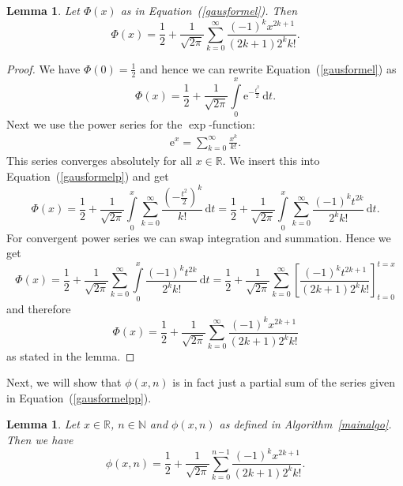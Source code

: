 \documentclass{article}
\newtheorem{lemma}[algorithm]{Lemma}
\newcommand\Rset{{\mathbb R}}
\newcommand\Nset{\mathbb N}
\newcommand\intd{{\mbox{d}}}
\begin{document}
\begin{lemma}
Let $\Phi(x)$ as in Equation~(\ref{gausformel}). Then
\begin{equation}\Phi(x)=\frac{1}{2}+\frac{1}{\sqrt{2\pi}}\sum_{k=0}^{\infty}\frac{(-1)^kx^{2k+1}}{(2k+1)2^kk!}.\label{gausformelpp}\end{equation}
\end{lemma}

\begin{proof}
We have $\Phi(0)=\frac{1}{2}$ and hence we can rewrite
Equation~(\ref{gausformel}) as
\begin{equation}\Phi(x)=\frac{1}{2}+\frac{1}{\sqrt{2\pi}}\int\limits_{0}^x\mbox{e}^{-\frac{t^2}{2}}\,\intd t.\label{gausformelp}\end{equation}
Next we use the power series for the $\exp$-function:
\begin{eqnarray*}\mbox{e}^x=\sum_{k=0}^{\infty}\frac{x^k}{k!}.\end{eqnarray*}
This series converges absolutely for all $x\in\Rset$. We insert this
into Equation~(\ref{gausformelp}) and get
\begin{equation*}\Phi(x)%
  =\frac{1}{2}+\frac{1}{\sqrt{2\pi}}\int\limits_{0}^x\sum_{k=0}^{\infty}\frac{\left(-\frac{t^2}{2}\right)^k}{k!}\,\intd t%
  =\frac{1}{2}+\frac{1}{\sqrt{2\pi}}\int\limits_{0}^x\sum_{k=0}^{\infty}\frac{(-1)^kt^{2k}}{2^kk!}\,\intd t%
.\end{equation*}
For convergent power series we can swap
integration and summation. Hence we get
\begin{equation*}\Phi(x)%
  =\frac{1}{2}+\frac{1}{\sqrt{2\pi}}\sum_{k=0}^{\infty}\int\limits_{0}^x\frac{(-1)^kt^{2k}}{2^kk!}\,\intd t%
  =\frac{1}{2}+\frac{1}{\sqrt{2\pi}}\sum_{k=0}^{\infty}\left[\frac{(-1)^kt^{2k+1}}{(2k+1)2^kk!}\right]_{t=0}^{t=x}%
\end{equation*}
and therefore
\[\Phi(x)=\frac{1}{2}+\frac{1}{\sqrt{2\pi}}\sum_{k=0}^{\infty}\frac{(-1)^kx^{2k+1}}{(2k+1)2^kk!}\]
as stated in the lemma.
\end{proof}

Next, we will show that $\phi(x,n)$ is in fact just a partial sum of
the series given in Equation~(\ref{gausformelpp}).

\begin{lemma}
Let $x\in\Rset$, $n\in\Nset$ and $\phi(x,n)$ as defined in
Algorithm~\ref{mainalgo}. Then we have
\begin{equation}\phi(x,n)=\frac{1}{2}+\frac{1}{\sqrt{2\pi}}\sum_{k=0}^{n-1}\frac{(-1)^kx^{2k+1}}{(2k+1)2^kk!}.\label{phigleichung}\end{equation}
\end{lemma}
\end{document}
